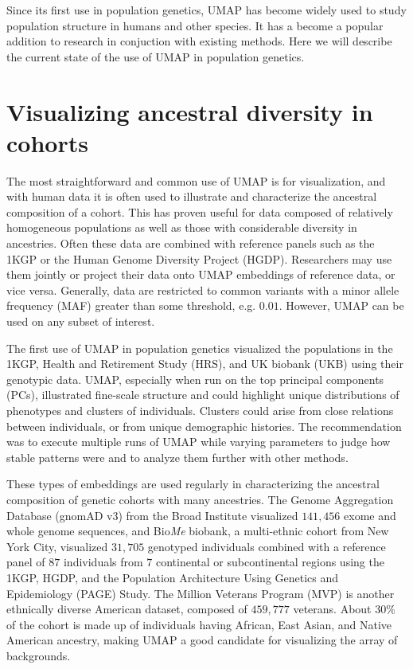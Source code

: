 \documentclass[12pt]{article}
\begin{document}
Since its first use in population genetics, UMAP has become widely used to study population structure in humans and other species. It has a become a popular addition to research in conjuction with existing methods. Here we will describe the current state of the use of UMAP in population genetics.

\section*{Visualizing ancestral diversity in cohorts}
The most straightforward and common use of UMAP is for visualization, and with human data it is often used to illustrate and characterize the ancestral composition of a cohort. This has proven useful for data composed of relatively homogeneous populations as well as those with considerable diversity in ancestries. Often these data are combined with reference panels such as the 1KGP or the Human Genome Diversity Project (HGDP)\cite{cann2002human}. Researchers may use them jointly or project their data onto UMAP embeddings of reference data, or vice versa. Generally, data are restricted to common variants with a minor allele frequency (MAF) greater than some threshold, e.g. $0.01$. However, UMAP can be used on any subset of interest.

The first use of UMAP in population genetics visualized the populations in the 1KGP, Health and Retirement Study (HRS)\cite{juster1995overview}, and UK biobank (UKB)\cite{sudlow2015uk} using their genotypic data. UMAP, especially when run on the top principal components (PCs), illustrated fine-scale structure and could highlight unique distributions of phenotypes and clusters of individuals. Clusters could arise from close relations between individuals, or from unique demographic histories. The recommendation was to execute multiple runs of UMAP while varying parameters to judge how stable patterns were and to analyze them further with other methods\cite{diaz-papkovich_umap_2019}.

These types of embeddings are used regularly in characterizing the ancestral composition of genetic cohorts with many ancestries. The Genome Aggregation Database (gnomAD v3) from the Broad Institute visualized $141,456$ exome and whole genome sequences\cite{karczewski_mutational_2020}, and Bio\textit{Me} biobank, a multi-ethnic cohort from New York City, visualized $31,705$ genotyped individuals combined with a reference panel of $87$ individuals from $7$ continental or subcontinental regions using the 1KGP, HGDP, and the Population Architecture Using Genetics and Epidemiology (PAGE) Study\cite{matise2011next}. The Million Veterans Program (MVP) is another ethnically diverse American dataset, composed of $459,777$ veterans. About $30\%$ of the cohort is made up of individuals having African, East Asian, and Native American ancestry\cite{hunter-zinck_genotyping_2020}, making UMAP a good candidate for visualizing the array of backgrounds.
\end{document}
